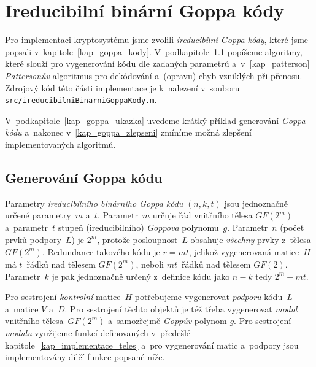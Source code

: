 \documentclass[thesis=M,czech,hidelinks]{FITthesis}[2012/06/26]
\newcommand{\0}{{\textcolor[gray]{0.75}{0}}}
\begin{document}
\newpage



\section{Ireducibilní binární Goppa kódy}\label{kap_implementace_goppa_kody}

Pro implementaci kryptosystému jsme zvolili \emph{ireducibilní Goppa kódy},
které jsme popsali v~kapitole~\ref{kap_goppa_kody}.
V~podkapitole~\ref{kap_generovani} popíšeme algoritmy, které slouží pro
vygenerování kódu dle zadaných parametrů a~v~\ref{kap_patterson}
\emph{Pattersonův} algoritmus pro dekódování a~(opravu) chyb vzniklých při
přenosu. Zdrojový kód této části implementace je k~nalezení v~souboru
\texttt{src/ireducibilni\-BinarniGoppaKody.m}.

V~podkapitole~\ref{kap_goppa_ukazka} uvedeme krátký příklad generování
\emph{Goppa kódu} a~nakonec v~\ref{kap_goppa_zlepseni} zmíníme možná zlepšení
implementovaných algoritmů.


\subsection{Generování Goppa kódu}\label{kap_generovani}

Parametry \emph{ireducibilního binárního Goppa kódu} $(n,k,t)$ jsou jednoznačně
určené parametry~$m$ a~$t$. Parametr~$m$ určuje řád vnitřního tělesa $GF(2^m)$
a~parametr~$t$ stupeň (ireducibilního) \emph{Goppova} polynomu~$g$. Parametr~$n$
(počet prvků podpory~$L$) je $2^m$, protože posloupnost~$L$ obsahuje
\emph{všechny} prvky z~tělesa $GF(2^m)$. Redundance takového kódu je $r=mt$,
jelikož vygenerovaná matice~$H$ má $t$~řádků nad tělesem $GF(2^m)$, neboli
$mt$~řádků nad tělesem $GF(2)$. Parametr~$k$ je pak jednoznačně určený
z~definice kódu jako $n-k$ tedy $2^m-mt$.

Pro sestrojení \emph{kontrolní} matice~$H$ potřebujeme vygenerovat
\emph{podporu} kó\-du~$L$ a~matice $V$ a~$D$. Pro sestrojení těchto objektů je též
třeba vygenerovat \emph{modul} vnitřního tělesa~$GF(2^m)$ a~samozřejmě
\emph{Goppův} polynom $g$. Pro sestrojení \emph{modulu} využijeme funkcí
definovaných v~předešlé kapitole~\ref{kap_implementace_teles} a~pro vygenerování
matic a~podpory jsou implementovány dílčí funkce popsané níže.
\end{document}
